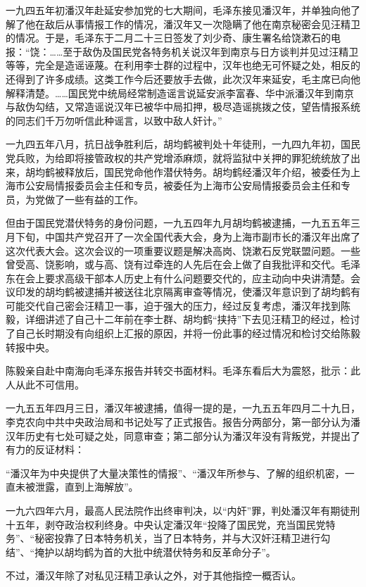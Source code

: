 \begin{maonote}
一九四五年初潘汉年赴延安参加党的七大期间，毛泽东接见潘汉年，并单独向他了解了他在敌后从事情报工作的情况，潘汉年又一次隐瞒了他在南京秘密会见汪精卫的情况。于是，毛泽东于二月二十三日签发了刘少奇、康生署名给饶漱石的电报：“饶：……至于敌伪及国民党各特务机关说汉年到南京与日方谈判并见过汪精卫等等，完全是造谣诬蔑。在利用李士群的过程中，汉年也绝无可怀疑之处，相反的还得到了许多成绩。这类工作今后还要放手去做，此次汉年来延安，毛主席已向他解释清楚。……国民党中统局经常制造谣言说延安派李富春、华中派潘汉年到南京与敌伪勾结，又常造谣说汉年已被华中局扣押，极尽造谣挑拨之伎，望告情报系统的同志们千万勿听信此种谣言，以致中敌人奸计。”

一九四五年八月，抗日战争胜利后，胡均鹤被判处十年徒刑，一九四九年初，国民党兵败，为给即将接管政权的共产党增添麻烦，就将监狱中关押的罪犯统统放了出来，胡均鹤被释放后，国民党命他作潜伏特务。胡均鹤经潘汉年介绍，被委任为上海市公安局情报委员会主任和专员，被委任为上海市公安局情报委员会主任和专员，为党做了一些有益的工作。

但由于国民党潜伏特务的身份问题，一九五四年九月胡均鹤被逮捕，一九五五年三月下旬，中国共产党召开了一次全国代表大会，身为上海市副市长的潘汉年出席了这次代表大会。这次会议的一项重要议题是解决高岗、饶漱石反党联盟问题。一些曾受高、饶影响，或与高、饶有过牵连的人先后在会上做了自我批评和交代。毛泽东在会上要求高级干部本人历史上有什么问题要交代的，应主动向中央讲清楚。会议印发的胡均鹤被逮捕并被送往北京隔离审查等情况，使潘汉年意识到了胡均鹤有可能交代自己密会汪精卫一事，迫于强大的压力，经过反复考虑，潘汉年找到陈毅，详细讲述了自己十二年前在李士群、胡均鹤“挟持”下去见汪精卫的经过，检讨了自己长时期没有向组织上汇报的原因，并将一份此事的经过情况和检讨交给陈毅转报中央。

陈毅亲自赴中南海向毛泽东报告并转交书面材料。毛泽东看后大为震怒，批示：此人从此不可信用。

一九五五年四月三日，潘汉年被逮捕，值得一提的是，一九五五年四月二十九日，李克农向中共中央政治局和书记处写了正式报告。报告分两部分，第一部分认为潘汉年历史有七处可疑之处，同意审查；第二部分认为潘汉年没有背叛党，并提出了有力的反证材料：

“潘汉年为中央提供了大量决策性的情报”、“潘汉年所参与、了解的组织机密，一直未被泄露，直到上海解放”。

一九六四年六月，最高人民法院作出终审判决，以“内奸”罪，判处潘汉年有期徒刑十五年，剥夺政治权利终身。中央认定潘汉年“投降了国民党，充当国民党特务”、“秘密投靠了日本特务机关，当了日本特务，并与大汉奸汪精卫进行勾结”、“掩护以胡均鹤为首的大批中统潜伏特务和反革命分子”。

不过，潘汉年除了对私见汪精卫承认之外，对于其他指控一概否认。


\end{maonote}
